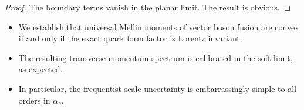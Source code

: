\begin{proof}
The boundary terms vanish in the planar limit. The result is obvious.
\end{proof}

\begin{itemize}
  \item We establish that universal Mellin moments of vector boson fusion are convex if and only if the exact quark form factor is Lorentz invariant.
  \item The resulting transverse momentum spectrum is calibrated in the soft limit, as expected.
  \item In particular, the frequentist scale uncertainty is embarrassingly simple to all orders in $\alpha_s$.
\end{itemize}

